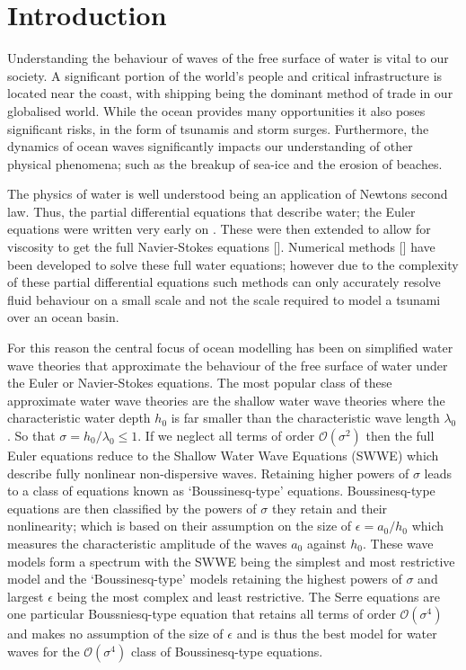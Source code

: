 
\chapter{Introduction}
\label{chp:Introduction}






Understanding the behaviour of waves of the free surface of water is vital to our society. A significant portion of the world's people and critical infrastructure is located near the coast, with shipping being the dominant method of trade in our globalised world. While the ocean provides many opportunities it also poses significant risks, in the form of tsunamis and storm surges. Furthermore, the dynamics of ocean waves significantly impacts our understanding of other physical phenomena; such as the breakup of sea-ice and the erosion of beaches. 

The physics of water is well understood being an application of Newtons second law. Thus, the partial differential equations that describe water; the Euler equations were written very early on \cite{Euler-1755-274}. These were then extended to allow for viscosity to get the full Navier-Stokes equations []. Numerical methods [] have been developed to solve these full water equations; however due to the complexity of these partial differential equations such methods can only accurately resolve fluid behaviour on a small scale and not the scale required to model a tsunami over an ocean basin. 

For this reason the central focus of ocean modelling has been on simplified water wave theories that approximate the behaviour of the free surface of water under the Euler or Navier-Stokes equations. The most popular class of these approximate water wave theories are the shallow water wave theories where the characteristic water depth $h_0$ is far smaller than the characteristic wave length $\lambda_0$. So that $\sigma = h_0 / \lambda_0 \le 1$. If we neglect all terms of order $\mathcal{O}\left(\sigma ^2\right)$ then the full Euler equations reduce to the Shallow Water Wave Equations (SWWE) which describe fully nonlinear non-dispersive waves. Retaining higher powers of $\sigma$ leads to a class of equations known as `Boussinesq-type' equations. Boussinesq-type equations are then classified by the powers of $\sigma$ they retain and their nonlinearity; which is based on their assumption on the size of $\epsilon= a_0 / h_0$ which measures the characteristic amplitude of the waves $a_0$ against $h_0$. These wave models form a spectrum with the SWWE being the simplest and most restrictive model and the `Boussinesq-type' models retaining the highest powers of $\sigma$ and largest $\epsilon$ being the most complex and least restrictive. The Serre equations are one particular Boussniesq-type equation that retains all terms of order $\mathcal{O}\left(\sigma ^4\right)$ and makes no assumption of the size of $\epsilon$ and is thus the best model for water waves for the $\mathcal{O}\left(\sigma ^4\right)$ class of Boussinesq-type equations. 

